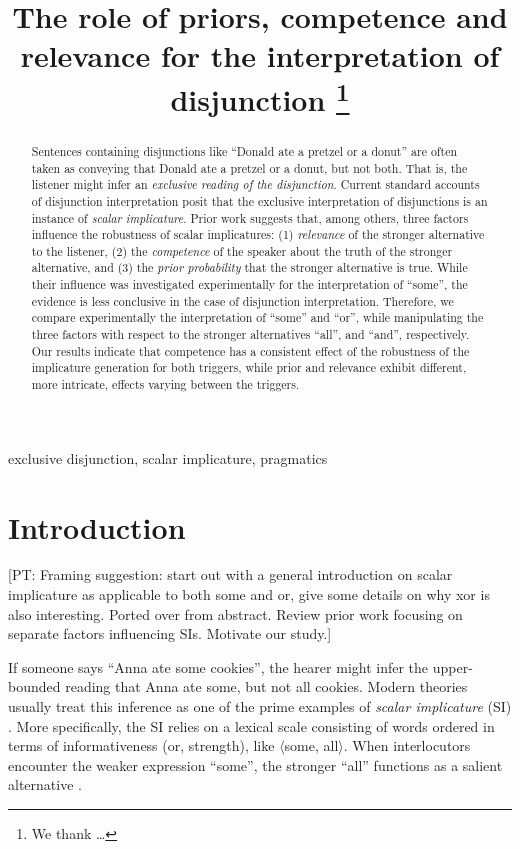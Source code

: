 \documentclass{sp}
\title[Exclusive disjunction]{The role of priors, competence and relevance for the interpretation of disjunction%
  \thanks{We thank \ldots}}
\author[]{%
  \spauthor{Michael Franke \\ \institute{Institute1}} \AND
  \spauthor{Bob van Tiel \\ \institute{Institute2}} \AND
  \spauthor{Polina Tsvilodub \\ \institute{Institute3}}}
\newcommand{\pt}[1]{\textcolor{Cerulean}{[PT: #1]}}
\begin{document}
\maketitle

\begin{abstract}
  
  Sentences containing disjunctions like ``Donald ate a pretzel or a donut'' are often taken as conveying that Donald ate a pretzel or a donut, but not both. That is, the listener might infer an \textit{exclusive reading of the disjunction}. Current standard accounts of disjunction interpretation posit that the exclusive interpretation of disjunctions is an instance of \textit{scalar implicature}. Prior work suggests that, among others, three factors influence the robustness of scalar implicatures: (1) \textit{relevance} of the stronger alternative to the listener, (2) the \textit{competence} of the speaker about the truth of the stronger alternative, and (3) the \textit{prior probability} that the stronger alternative is true. While their influence was investigated experimentally for the interpretation of ``some'', the evidence is less conclusive in the case of disjunction interpretation. Therefore, we compare experimentally the interpretation of ``some'' and ``or'', while manipulating the three factors with respect to the stronger alternatives “all”, and “and”, respectively. Our results indicate that competence has a consistent effect of the robustness of the implicature generation for both triggers, while prior and relevance exhibit different, more intricate, effects varying between the triggers.
  
\end{abstract}

\begin{keywords}
 exclusive disjunction, scalar implicature, pragmatics
\end{keywords}

\section{Introduction}

\pt{Framing suggestion: start out with a general introduction on scalar implicature as applicable to both some and or,  give some details on why xor is also interesting. Ported over from abstract. Review prior work focusing on separate factors influencing SIs. Motivate our study.}

If someone says “Anna ate some cookies”, the hearer might infer the upper-bounded reading that Anna ate some, but not all cookies. Modern theories usually treat this inference as one of the prime examples of \textit{scalar implicature} (SI) \citep{horn1972semantic}. More specifically, the SI relies on a lexical scale consisting of words ordered in terms of informativeness (or, strength), like $\langle$some, all$\rangle$. When interlocutors encounter the weaker expression ``some'', the stronger ``all'' functions as a salient alternative \citep{matsumoto1995conversational}. 
\end{document}
